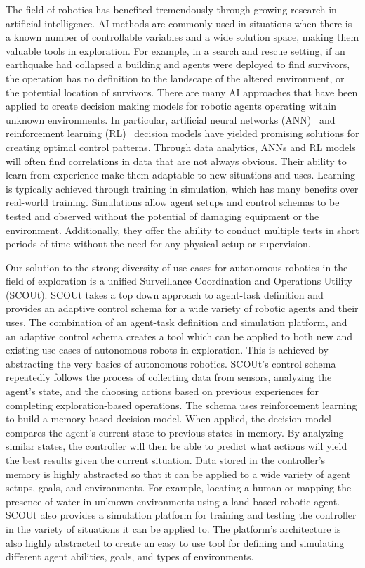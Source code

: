 The field of robotics has benefited tremendously through growing research in artificial intelligence.
AI methods are commonly used in situations when there is a known number of controllable variables and a wide solution space, making them valuable tools in exploration.
For example, in a search and rescue setting, if an earthquake had collapsed a building and agents were deployed to find survivors, the operation has no definition to the landscape of the altered environment, or the potential location of survivors.
There are many AI approaches that have been applied to create decision making models for robotic agents operating within unknown environments.
In particular, artificial neural networks (ANN)~\cite{kiumarsi_optimal_2018, arulkumaran_brief_2017, tai_autonomous_2017, bai_toward_2017} and reinforcement learning (RL)~\cite{kiumarsi_optimal_2018, arulkumaran_brief_2017, sutton_reinforcement_1998} decision models have yielded promising solutions for creating optimal control patterns.
Through data analytics, ANNs and RL models will often find correlations in data that are not always obvious.
Their ability to learn from experience make them adaptable to new situations and uses.
Learning is typically achieved through training in simulation, which has many benefits over real-world training.
Simulations allow agent setups and control schemas to be tested and observed without the potential of damaging equipment or the environment.
Additionally, they offer the ability to conduct multiple tests in short periods of time without the need for any physical setup or supervision.

Our solution to the strong diversity of use cases for autonomous robotics in the field of exploration is a unified Surveillance Coordination and Operations Utility (SCOUt).
SCOUt takes a top down approach to agent-task definition and provides an adaptive control schema for a wide variety of robotic agents and their uses.
The combination of an agent-task definition and simulation platform, and an adaptive control schema creates a tool which can be applied to both new and existing use cases of autonomous robots in exploration.
This is achieved by abstracting the very basics of autonomous robotics.
SCOUt's control schema repeatedly follows the process of collecting data from sensors, analyzing the agent's state, and the choosing actions based on previous experiences for completing exploration-based operations.
The schema uses reinforcement learning to build a memory-based decision model.
When applied, the decision model compares the agent's current state to previous states in memory.
By analyzing similar states, the controller will then be able to predict what actions will yield the best results given the current situation.
Data stored in the controller's memory is highly abstracted so that it can be applied to a wide variety of agent setups, goals, and environments.
For example, locating a human or mapping the presence of water in unknown environments using a land-based robotic agent.
SCOUt also provides a simulation platform for training and testing the controller in the variety of situations it can be applied to.
The platform's architecture is also highly abstracted to create an easy to use tool for defining and simulating different agent abilities, goals, and types of environments.

